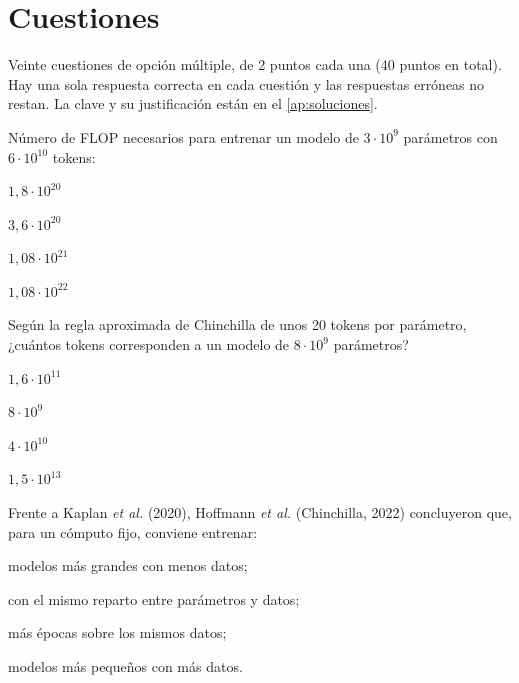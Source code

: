 \chapter{Cuestiones}
\label{cap:test}

Veinte cuestiones de opción múltiple, de 2 puntos cada una (40 puntos en total). Hay una sola respuesta correcta en cada cuestión y las respuestas erróneas no restan. La clave y su justificación están en el \cref{ap:soluciones}.

\begin{cuestiones}
\item {} Número de FLOP necesarios para entrenar un modelo de $3\cdot 10^{9}$ parámetros con $6\cdot 10^{10}$ tokens:
\begin{opciones}
  \item $1{,}8\cdot 10^{20}$
  \item $3{,}6\cdot 10^{20}$
  \item $1{,}08\cdot 10^{21}$
  \item $1{,}08\cdot 10^{22}$
\end{opciones}

\item {} Según la regla aproximada de Chinchilla de unos 20 tokens por parámetro, ¿cuántos tokens corresponden a un modelo de $8\cdot 10^{9}$ parámetros?
\begin{opciones}
  \item $1{,}6\cdot 10^{11}$
  \item $8\cdot 10^{9}$
  \item $4\cdot 10^{10}$
  \item $1{,}5\cdot 10^{13}$
\end{opciones}

\item {} Frente a Kaplan \emph{et al.} (2020), Hoffmann \emph{et al.} (Chinchilla, 2022) concluyeron que, para un cómputo fijo, conviene entrenar:
\begin{opciones}
  \item modelos más grandes con menos datos;
  \item con el mismo reparto entre parámetros y datos;
  \item más épocas sobre los mismos datos;
  \item modelos más pequeños con más datos.
\end{opciones}


\end{cuestiones}
